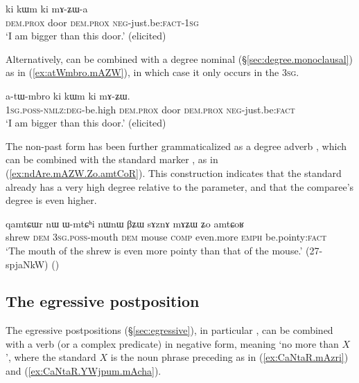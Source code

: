 \begin{exe}
\ex \label{ex:mAZWa}
 \gll ki kɯm ki mɤ-ʑɯ-a \\
\textsc{dem}.\textsc{prox} door \textsc{dem}.\textsc{prox} \textsc{neg}-just.be:\textsc{fact}-\textsc{1sg} \\
\glt `I am bigger than this door.' (elicited)
\end{exe}

Alternatively,  can be combined with a degree nominal (§\ref{sec:degree.monoclausal}) as in (\ref{ex:atWmbro.mAZW}), in which case it only occurs in the \textsc{3sg}.

\begin{exe}
\ex \label{ex:atWmbro.mAZW}
 \gll a-tɯ-mbro ki kɯm ki mɤ-ʑɯ. \\
 \textsc{1sg}.\textsc{poss}-\textsc{nmlz}:\textsc{deg}-be.high \textsc{dem}.\textsc{prox} door \textsc{dem}.\textsc{prox} \textsc{neg}-just.be:\textsc{fact} \\
\glt `I am bigger than this door.' (elicited)
\end{exe}

The non-past form  has been further grammaticalized as a degree adverb , which can be combined with the standard marker , as in (\ref{ex:ndAre.mAZW.Zo.amtCoR}). This construction indicates that the standard already has a very high degree relative to the parameter, and that the comparee's degree is even higher.

\begin{exe}
\ex \label{ex:ndAre.mAZW.Zo.amtCoR}
 \gll qamtɕɯr nɯ ɯ-mtɕʰi nɯnɯ βʑɯ sɤznɤ mɤʑɯ ʑo amtɕoʁ \\
 shrew \textsc{dem} \textsc{3sg}.\textsc{poss}-mouth \textsc{dem} mouse \textsc{comp} even.more \textsc{emph} be.pointy:\textsc{fact} \\
\glt `The mouth of the shrew is even more pointy than that of the mouse.' (27-spjaNkW)
()
\end{exe}

\subsection{The egressive postposition } \label{sec:egressive.comparative}
The egressive postpositions (§\ref{sec:egressive}), in particular , can be combined with a verb (or a complex predicate) in negative form, meaning `no more than $X$', where the standard $X$ is the noun phrase preceding  as in (\ref{ex:CaNtaR.mAzri}) and (\ref{ex:CaNtaR.YWjpum.mAcha}).

